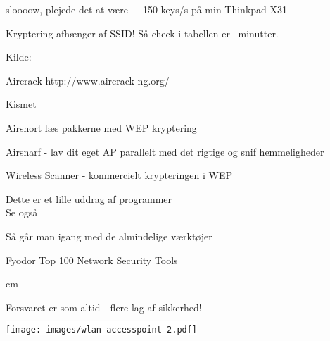 \begin{list1}
\item sloooow, plejede det at være -  ~150 keys/s på min Thinkpad X31
\item Kryptering afhænger af SSID! Så check i tabellen er ~minutter.
\item {} 
\end{list1}



Kilde: 



\begin{list2}
\item Aircrack {http://www.aircrack-ng.org/}
\item Kismet 
\item Airsnort  læs pakkerne med WEP
  kryptering  
\item Airsnarf  - lav dit eget AP
  parallelt med det rigtige og snif hemmeligheder
\item Wireless Scanner  - kommercielt 
  krypteringen i WEP
\item Dette er et lille uddrag af programmer\\
Se også 
\end{list2}


\begin{list1}
\item Så går man igang med de almindelige værktøjer
\item Fyodor Top 100 Network Security Tools   
\end{list1}
 cm

\centerline{\hlkbig Forsvaret er som altid - flere lag af sikkerhed! }


\begin{center}
\colorbox{white}{\texttt{[image: images/wlan-accesspoint-2.pdf]}}
\end{center}

